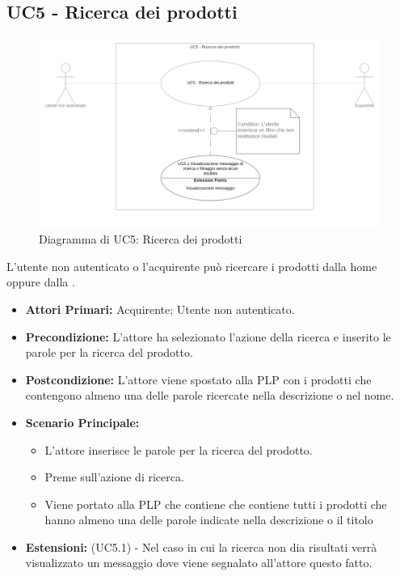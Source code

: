 \subsection{UC5 - Ricerca dei prodotti} \label{UC5}

\begin{figure}[H]
    \centering
    \includegraphics[width=\textwidth]{Immagini/DiagrammiUC/UC5RicercaDeiProdotti.png}
    \caption{Diagramma di UC5: Ricerca dei prodotti} 
    \label{fig:RicercaDeiProdotti}
\end{figure}

L'utente non autenticato o l'acquirente può ricercare i prodotti dalla home oppure dalla .
\begin{itemize}
    \item \textbf{Attori Primari:} Acquirente; Utente non autenticato.
    \item \textbf{Precondizione:} L'attore ha selezionato l'azione della ricerca e inserito le parole per la ricerca del prodotto.
    \item \textbf{Postcondizione:} L'attore viene spostato alla PLP con i prodotti che contengono almeno una delle parole ricercate nella descrizione o nel nome. 
    \item \textbf{Scenario Principale:} 
    \begin{itemize}
        \item L'attore inserisce le parole per la ricerca del prodotto.
        \item Preme sull'azione di ricerca.
        \item Viene portato alla PLP che contiene che contiene tutti i prodotti che hanno almeno una delle parole indicate nella descrizione o il titolo
    \end{itemize}
    \item \textbf{Estensioni:} (UC5.1) - Nel caso in cui la ricerca non dia risultati verrà visualizzato un messaggio dove viene segnalato all'attore questo fatto.
\end{itemize}

